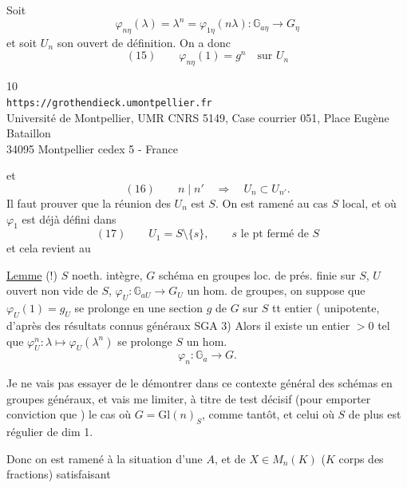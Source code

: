 Soit
\[
\varphi_{n\eta}(\lambda)=\lambda^n=\varphi_{1\eta}(n\lambda):\mathbb G_{a\eta}\longrightarrow G_\eta
\]
et soit $U_n$ son ouvert de définition. On a donc
\[
(15)\qquad\varphi_{n\eta}(1)=g^n\quad\text{sur }U_n
\]

\begin{center}
\small
10\\
\texttt{https://grothendieck.umontpellier.fr}\\
Université de Montpellier, UMR CNRS 5149, Case courrier 051, Place Eugène Bataillon\\
34095 Montpellier cedex 5 - France
\end{center}
et
\[
(16)\qquad n\mid n'\quad\Longrightarrow\quad U_n\subset U_{n'}.
\]
Il faut prouver que la réunion des $U_n$ est $S$. On est ramené au cas $S$ local, et où $\varphi_1$ est déjà défini dans
\[
(17)\qquad U_1=S\setminus\{s\},\qquad s\text{ le pt fermé de }S
\]
et cela revient au

\uline{Lemme} (!)  $S$ noeth. intègre, $G$ schéma en groupes  loc. de prés. finie sur $S$, $U$ ouvert non vide de $S$, $\varphi_U:\mathbb G_{aU}\longrightarrow G_U$ un hom. de groupes, on suppose que $\varphi_U(1)=g_U$ se prolonge en une section $g$ de $G$ sur $S$ tt entier ( unipotente, d'après des résultats connus généraux  SGA 3) Alors il existe un entier $>0$ tel que $\varphi_U^n:\lambda\longmapsto\varphi_U(\lambda^n)$ se prolonge  $S$ un hom.
\[
\varphi_n:\mathbb G_a\longrightarrow G.
\]

Je ne vais pas essayer de le démontrer dans ce contexte général des schémas en groupes généraux, et vais me limiter, à titre de test décisif (pour emporter conviction que ) le cas où $G=\mathrm{Gl}(n)_S$, comme tantôt, et celui où $S$ de plus est régulier de dim 1.

Donc on est ramené à la situation d'une  $A$, et de $X\in M_n(K)$ ($K$ corps des fractions) satisfaisant

